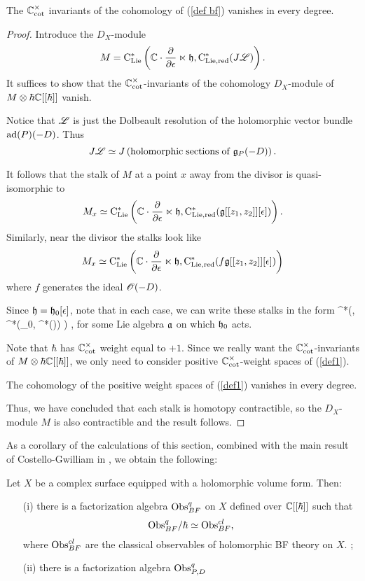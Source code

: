 \documentclass[11pt]{amsart}
\begin{document}
\begin{lem}
The $\mathbb C^\times_{\rm cot}$ invariants of the cohomology of (\ref{def bf}) vanishes in every degree. 
\end{lem}
\begin{proof}
Introduce the $D_X$-module
\[
M = {\rm C}_{{\rm Lie}}^*\left(\mathbb C \cdot \frac{\partial}{\partial \epsilon} \ltimes \mathfrak h, {\rm C}_{\rm Lie, red}^*(J \mathscr L) \right). 
\]
It suffices to show that the $\mathbb C^{\times}_{\rm cot}$-invariants of the cohomology $D_X$-module of $M \otimes \hbar \mathbb C[[\hbar]]$ vanish. 

Notice that $\mathscr L$ is just the Dolbeault resolution of the holomorphic vector bundle ${\rm ad}(P)(-D)$. 
Thus
\[
J \mathscr L \simeq J\left({\rm holomorphic\;sections\;of\;}\mathfrak g_P(-D)\right) .
\]

It follows that the stalk of $M$ at a point $x$ away from the divisor is quasi-isomorphic to
\[
M_x \simeq {\rm C}_{{\rm Lie}}^*\left(\mathbb C \cdot \frac{\partial}{\partial \epsilon} \ltimes \mathfrak h, {\rm C}_{\rm Lie, red}^*(\mathfrak g[[z_1,z_2]][\epsilon]) \right) .
\]
Similarly, near the divisor the stalks look like
\[
M_x \simeq {\rm C}_{{\rm Lie}}^*\left(\mathbb C \cdot \frac{\partial}{\partial \epsilon} \ltimes \mathfrak h, {\rm C}_{\rm Lie, red}^*(f\mathfrak g[[z_1,z_2]][\epsilon]) \right)
\]
where $f$ generates the ideal $\mathscr O(-D)$. 

Since $\mathfrak h = \mathfrak h_0[\epsilon]$, note that in each case, we can write these stalks in the form
\beqn\label{def1}
 \clie^*\left(\CC \cdot \frac{\partial}{\partial \epsilon}, \clie^*(\fh_0, \cred^*(\fa [\epsilon])) \right) ,
\eeqn
for some Lie algebra $\mathfrak a$ on which $\mathfrak h_0$ acts. 

Note that $\hbar$ has $\mathbb C^\times_{\rm cot}$ weight equal to $+1$. 
Since we really want the $\mathbb C^\times_{\rm cot}$-invariants of $M \otimes \hbar \mathbb C[[\hbar]]$, we only need to consider positive $\mathbb C^\times_{\rm cot}$-weight spaces of (\ref{def1}). 

\begin{lem}
The cohomology of the positive weight spaces of (\ref{def1}) vanishes in every degree. 
\end{lem} 

Thus, we have concluded that each stalk is homotopy contractible, so the $D_X$-module $M$ is also contractible and the result follows. 
\end{proof}

As a corollary of the calculations of this section, combined with the main result of Costello-Gwilliam in \cite{CG2}, we obtain the following:

\begin{thm}\label{thm: qfact}
Let $X$ be a complex surface equipped with a holomorphic volume form.
Then:
\begin{enumerate}
\item[(i)]
there is a factorization algebra ${\rm Obs}^{q}_{BF}$ on $X$ defined over $\mathbb C[[\hbar]]$ such that
\[
{\rm Obs}^q_{BF} / \hbar \simeq {\rm Obs}^{cl}_{BF},
\] 
where ${\rm Obs}^{cl}_{BF}$ are the classical observables of holomorphic BF theory on $X$. ;
\item[(ii)] 
there is a factorization algebra ${\rm Obs}_{P,D}^q$
\end{enumerate}
\end{thm}
\end{document}
